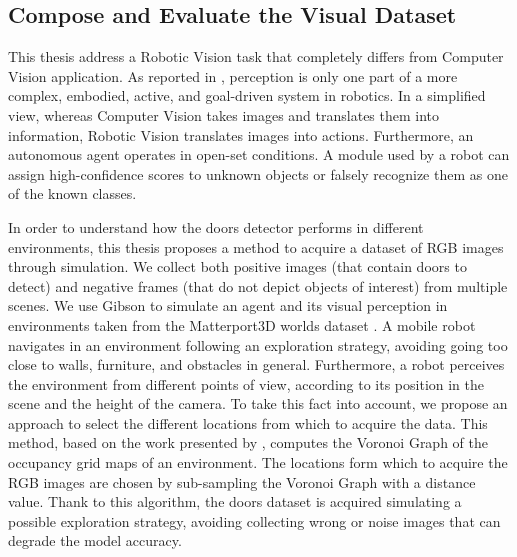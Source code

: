 \subsection{Compose and Evaluate the Visual Dataset}
This thesis address a Robotic Vision task that completely differs from Computer Vision application. As reported in \cite{surveydeeplimits}, perception is only one part of a more complex, embodied, active, and goal-driven system in robotics.
In a simplified view, whereas Computer Vision takes images and translates them into information, Robotic Vision translates images into actions. Furthermore, an autonomous agent operates in open-set conditions. A module used by a robot can assign high-confidence scores to unknown objects or falsely recognize them as one of the known classes. 

In order to understand how the doors detector performs in different environments, this thesis proposes a method to acquire a dataset of RGB images through simulation. We collect both positive images (that contain doors to detect) and negative frames (that do not depict objects of interest) from multiple scenes. We use Gibson \cite{gibson} to simulate an agent and its visual perception in environments taken from the Matterport3D worlds dataset \cite{matterport}. A mobile robot navigates in an environment following an exploration strategy, avoiding going too close to walls, furniture, and obstacles in general. Furthermore, a robot perceives the environment from different points of view, according to its position in the scene and the height of the camera. To take this fact into account, we propose an approach to select the different locations from which to acquire the data. This method, based on the work presented by \citeauthor{repeatabilityslamarxiv} \cite{repeatabilityslamarxiv, repeatabilityslam}, computes the Voronoi Graph of the occupancy grid maps of an environment. The locations form which to acquire the RGB images are chosen by sub-sampling the Voronoi Graph with a distance value. Thank to this algorithm, the doors dataset is acquired simulating a possible exploration strategy, avoiding collecting wrong or noise images that can degrade the model accuracy.

